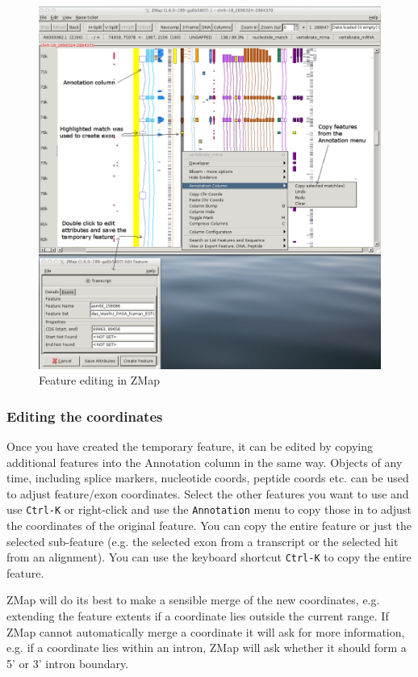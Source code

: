 \documentclass[letterpaper]{article}
\begin{document}
\begin{figure}
\centering
\color[rgb]{0.30980393,0.5058824,0.7411765}
\includegraphics[width=15.231cm]{images/editing_zmap.png}
\caption{Feature editing in ZMap}
\label{img_editing_zmap}
\end{figure}

\subsubsection{Editing the coordinates}
Once you have created the temporary feature, it can be edited by copying additional features into the Annotation column in the same way. Objects of any time, including splice markers, nucleotide coords, peptide coords etc. can be used to adjust feature/exon coordinates. Select the other features you want to use and use \lstinline{Ctrl-K} or right-click and use the \lstinline{Annotation} menu to copy those in to adjust the coordinates of the original feature. You can copy the entire feature or just the selected sub-feature (e.g. the selected exon from a transcript or the selected hit from an alignment). You can use the keyboard shortcut \lstinline{Ctrl-K} to copy the entire feature. 

ZMap will do its best to make a sensible merge of the new coordinates, e.g. extending the feature extents if a coordinate lies outside the current range. If ZMap cannot automatically merge a coordinate it will ask for more information, e.g. if a coordinate lies within an intron, ZMap will ask whether it should form a 5' or 3' intron boundary.
\end{document}

